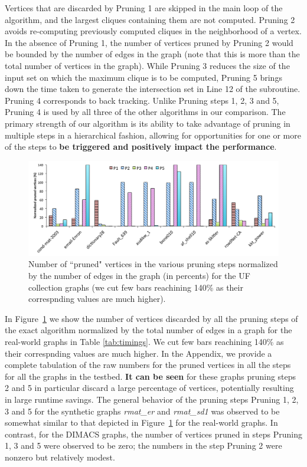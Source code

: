 Vertices that are discarded by Pruning 1 are skipped in the main loop of the algorithm, and the largest cliques containing them are not computed. Pruning 2 avoids re-computing previously computed cliques in the neighborhood of a vertex. In the absence of Pruning 1, the number of vertices pruned by Pruning 2 would be bounded by the number of edges in the graph (note that this is more than the total number of vertices in the graph). While Pruning 3 reduces the size of the input set on which the maximum clique is to be computed, Pruning 5 brings down the time taken to generate the intersection set in Line 12 of the subroutine. 
Pruning 4 corresponds to back tracking. Unlike Pruning steps 1, 2, 3 and 5, Pruning 4
is used  by all three of the other algorithms in our comparison. The primary strength of our algorithm is its ability to take advantage of pruning in multiple steps in a hierarchical fashion, allowing for opportunities for one or more of the steps to {\bf be triggered and positively impact the performance}.

\begin{figure}
  \centering
    \includegraphics[scale=0.5]{pruned.pdf}
\caption{Number of ``pruned" vertices in the various pruning steps normalized
by the number of edges in the graph (in percents) for the UF collection graphs (we cut few bars reachining 140\% as their correspnding values are much higher).}
\label{fig-pruningplot}
\end{figure}


In Figure~\ref{fig-pruningplot} we show the number of vertices discarded by all
the  pruning steps of the exact algorithm normalized by the total number of edges
in a graph for the real-world graphs in Table \ref{tab:timings}. We cut few bars reachining
140\% as their correspnding values are much higher.
In the Appendix, we provide a complete tabulation of the raw numbers for the pruned vertices in all the steps for all the graphs in the testbed. {\bf It can be seen} for these graphs pruning steps 2 and 5 in particular discard a large percentage of vertices, potentially resulting in large runtime savings. The general behavior of the pruning steps Pruning 1, 2, 3 and 5 for the synthetic graphs {\em rmat\_er} and {\em rmat\_sd1} was observed to be somewhat similar to that depicted in Figure~\ref{fig-pruningplot} for the real-world graphs. In contrast, for the DIMACS graphs, the number of vertices pruned in steps Pruning 1, 3 and 5 were observed to be zero; the numbers in the step Pruning 2 were nonzero but relatively modest.


